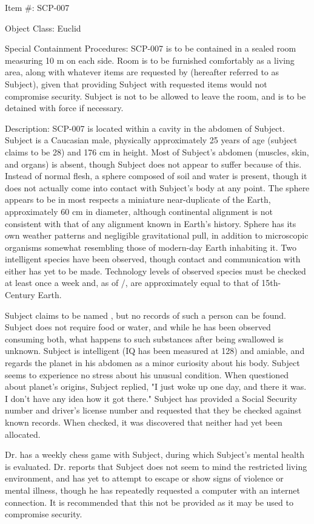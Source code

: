 Item \#: SCP-007

Object Class: Euclid

Special Containment Procedures: SCP-007 is to be contained in a sealed room measuring 10 m on each side. Room is to be furnished comfortably as a living area, along with whatever items are requested by  (hereafter referred to as Subject), given that providing Subject with requested items would not compromise security. Subject is not to be allowed to leave the room, and is to be detained with force if necessary.

Description: SCP-007 is located within a cavity in the abdomen of Subject. Subject is a Caucasian male, physically approximately 25 years of age (subject claims to be 28) and 176 cm in height. Most of Subject's abdomen (muscles, skin, and organs) is absent, though Subject does not appear to suffer because of this. Instead of normal flesh, a sphere composed of soil and water is present, though it does not actually come into contact with Subject's body at any point. The sphere appears to be in most respects a miniature near-duplicate of the Earth, approximately 60 cm in diameter, although continental alignment is not consistent with that of any alignment known in Earth's history. Sphere has its own weather patterns and negligible gravitational pull, in addition to microscopic organisms somewhat resembling those of modern-day Earth inhabiting it. Two intelligent species have been observed, though contact and communication with either has yet to be made. Technology levels of observed species must be checked at least once a week and, as of /, are approximately equal to that of 15th-Century Earth.

Subject claims to be named , but no records of such a person can be found. Subject does not require food or water, and while he has been observed consuming both, what happens to such substances after being swallowed is unknown. Subject is intelligent (IQ has been measured at 128) and amiable, and regards the planet in his abdomen as a minor curiosity about his body. Subject seems to experience no stress about his unusual condition. When questioned about planet's origins, Subject replied, "I just woke up one day, and there it was. I don't have any idea how it got there." Subject has provided a Social Security number and driver's license number and requested that they be checked against known records. When checked, it was discovered that neither had yet been allocated.

Dr.  has a weekly chess game with Subject, during which Subject's mental health is evaluated. Dr.  reports that Subject does not seem to mind the restricted living environment, and has yet to attempt to escape or show signs of violence or mental illness, though he has repeatedly requested a computer with an internet connection. It is recommended that this not be provided as it may be used to compromise security.